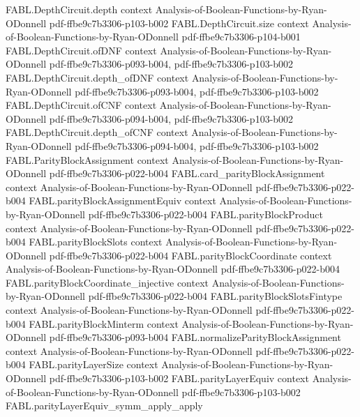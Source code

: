\begin{theorem}
  {FABL.DepthCircuit.depth}
  {context}
  {Analysis-of-Boolean-Functions-by-Ryan-ODonnell}
  {pdf-ffbe9c7b3306-p103-b002}
\proofstep
  {FABL.DepthCircuit.size}
  {context}
  {Analysis-of-Boolean-Functions-by-Ryan-ODonnell}
  {pdf-ffbe9c7b3306-p104-b001}
\proofstep
  {FABL.DepthCircuit.ofDNF}
  {context}
  {Analysis-of-Boolean-Functions-by-Ryan-ODonnell}
  {pdf-ffbe9c7b3306-p093-b004,
    pdf-ffbe9c7b3306-p103-b002}
\proofstep
  {FABL.DepthCircuit.depth_ofDNF}
  {context}
  {Analysis-of-Boolean-Functions-by-Ryan-ODonnell}
  {pdf-ffbe9c7b3306-p093-b004,
    pdf-ffbe9c7b3306-p103-b002}
\proofstep
  {FABL.DepthCircuit.ofCNF}
  {context}
  {Analysis-of-Boolean-Functions-by-Ryan-ODonnell}
  {pdf-ffbe9c7b3306-p094-b004,
    pdf-ffbe9c7b3306-p103-b002}
\proofstep
  {FABL.DepthCircuit.depth_ofCNF}
  {context}
  {Analysis-of-Boolean-Functions-by-Ryan-ODonnell}
  {pdf-ffbe9c7b3306-p094-b004,
    pdf-ffbe9c7b3306-p103-b002}
\proofstep
  {FABL.ParityBlockAssignment}
  {context}
  {Analysis-of-Boolean-Functions-by-Ryan-ODonnell}
  {pdf-ffbe9c7b3306-p022-b004}
\proofstep
  {FABL.card_parityBlockAssignment}
  {context}
  {Analysis-of-Boolean-Functions-by-Ryan-ODonnell}
  {pdf-ffbe9c7b3306-p022-b004}
\proofstep
  {FABL.parityBlockAssignmentEquiv}
  {context}
  {Analysis-of-Boolean-Functions-by-Ryan-ODonnell}
  {pdf-ffbe9c7b3306-p022-b004}
\proofstep
  {FABL.parityBlockProduct}
  {context}
  {Analysis-of-Boolean-Functions-by-Ryan-ODonnell}
  {pdf-ffbe9c7b3306-p022-b004}
\proofstep
  {FABL.parityBlockSlots}
  {context}
  {Analysis-of-Boolean-Functions-by-Ryan-ODonnell}
  {pdf-ffbe9c7b3306-p022-b004}
\proofstep
  {FABL.parityBlockCoordinate}
  {context}
  {Analysis-of-Boolean-Functions-by-Ryan-ODonnell}
  {pdf-ffbe9c7b3306-p022-b004}
\proofstep
  {FABL.parityBlockCoordinate_injective}
  {context}
  {Analysis-of-Boolean-Functions-by-Ryan-ODonnell}
  {pdf-ffbe9c7b3306-p022-b004}
\proofstep
  {FABL.parityBlockSlotsFintype}
  {context}
  {Analysis-of-Boolean-Functions-by-Ryan-ODonnell}
  {pdf-ffbe9c7b3306-p022-b004}
\proofstep
  {FABL.parityBlockMinterm}
  {context}
  {Analysis-of-Boolean-Functions-by-Ryan-ODonnell}
  {pdf-ffbe9c7b3306-p093-b004}
\proofstep
  {FABL.normalizeParityBlockAssignment}
  {context}
  {Analysis-of-Boolean-Functions-by-Ryan-ODonnell}
  {pdf-ffbe9c7b3306-p022-b004}
\proofstep
  {FABL.parityLayerSize}
  {context}
  {Analysis-of-Boolean-Functions-by-Ryan-ODonnell}
  {pdf-ffbe9c7b3306-p103-b002}
\proofstep
  {FABL.parityLayerEquiv}
  {context}
  {Analysis-of-Boolean-Functions-by-Ryan-ODonnell}
  {pdf-ffbe9c7b3306-p103-b002}
\proofstep
  {FABL.parityLayerEquiv_symm_apply_apply}

\end{theorem}

